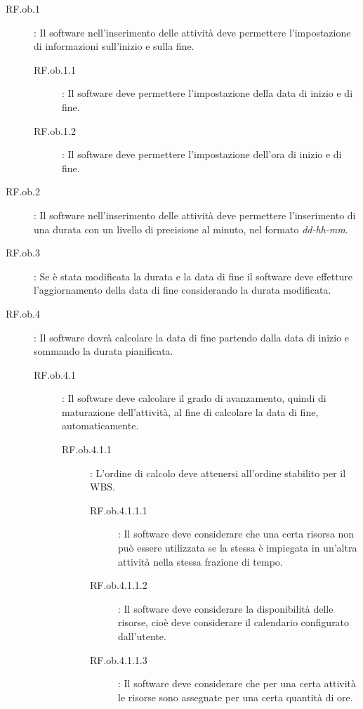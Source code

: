 \begin{description}
\item[RF.ob.1]: Il software nell\textquoteright{}inserimento delle attivit\`{a} deve permettere l\textquoteright{}impostazione di informazioni sull\textquoteright{}inizio e sulla fine.
	\begin{description}
	\item[RF.ob.1.1]: Il software deve permettere l\textquoteright{}impostazione della data di inizio e di fine.
	\item[RF.ob.1.2]: Il software deve permettere l\textquoteright{}impostazione dell\textquoteright{}ora di inizio e di fine.
	\end{description}
\item[RF.ob.2]: Il software nell\textquoteright{}inserimento delle attivit\`{a} deve permettere l\textquoteright{}inserimento di una durata con un livello di precisione al minuto, nel formato \textit{dd-hh-mm}.
\item[RF.ob.3]: Se \`{e} stata modificata la durata e la data di fine il software deve effetture l\textquoteright{}aggiornamento della data di fine considerando la durata modificata.
\item[RF.ob.4]: Il software dovr\`{a} calcolare la data di fine partendo dalla data di inizio e sommando la durata pianificata.
	\begin{description}
	\item[RF.ob.4.1]: Il software deve calcolare il grado di avanzamento, quindi di maturazione dell\textquoteright{}attivit\`{a}, al fine di calcolare la data di fine, automaticamente.
		\begin{description}
		\item[RF.ob.4.1.1]: L\textquoteright{}ordine di calcolo deve attenersi all\textquoteright{}ordine stabilito per il WBS. 
			\begin{description}
			\item[RF.ob.4.1.1.1]: Il software deve considerare che una certa risorsa non pu\`{o} essere utilizzata se la stessa \`{e} impiegata in un\textquoteright{}altra attivit\`{a} nella stessa frazione di tempo.
			\item[RF.ob.4.1.1.2]: Il software deve considerare la disponibilit\`{a} delle risorse, cio\`{e} deve considerare il calendario configurato dall\textquoteright{}utente.
			\item[RF.ob.4.1.1.3]: Il software deve considerare che per una certa attivit\`{a} le risorse sono assegnate per una certa quantit\`{a} di ore. 
			\end{description}

\end{description}
\end{description}
\end{description}
